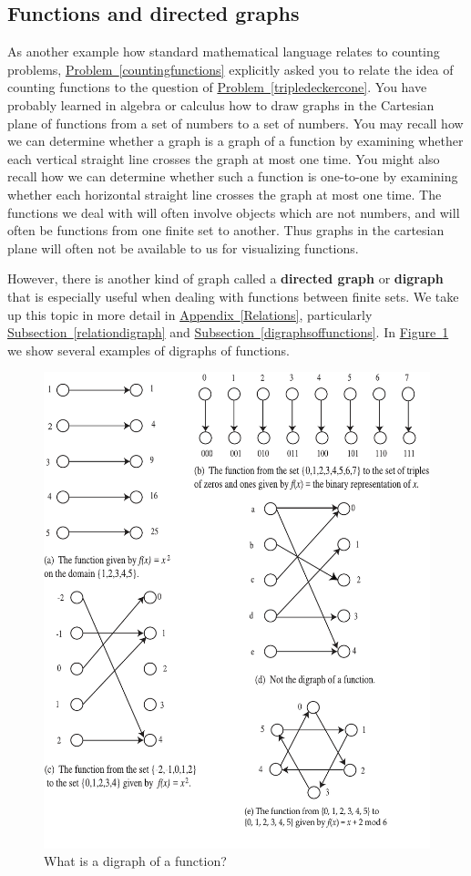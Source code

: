 \documentclass[10pt,]{book}
\newcommand{\terminology}[1]{\textbf{#1}}
\theoremstyle{plain}
\theoremstyle{definition}
\theoremstyle{definition}
\numberwithin{equation}{chapter}
\begin{document}
\subsection[{Functions and directed graphs}]{Functions and directed graphs}\label{subsection-2}
As another example how standard mathematical language relates to counting problems, \hyperref[countingfunctions]{Problem~\ref{countingfunctions}} explicitly asked you to relate the idea of counting functions to the question of \hyperref[tripledeckercone]{Problem~\ref{tripledeckercone}}. You have probably learned in algebra or calculus how to draw graphs in the Cartesian plane of functions from a set of numbers to a set of numbers. You may recall how we can determine whether a graph is a graph of a function by examining whether each vertical straight line crosses the graph at most one time. You might also recall how we can determine whether such a function is one-to-one by examining whether each horizontal straight line crosses the graph at most one time. The functions we deal with will often involve objects which are not numbers, and will often be functions from one finite set to another. Thus graphs in the cartesian plane will often not be available to us for visualizing functions.%
\par
However, there is another kind of graph called a \terminology{directed graph} or \terminology{digraph} that is especially useful when dealing with functions between finite sets. We take up this topic in more detail in \hyperref[Relations]{Appendix~\ref{Relations}}, particularly \hyperref[relationdigraph]{Subsection~\ref{relationdigraph}} and \hyperref[digraphsoffunctions]{Subsection~\ref{digraphsoffunctions}}. In \hyperref[functiondigraphs]{Figure~\ref{functiondigraphs}} we show several examples of digraphs of functions.%
\begin{figure}
\centering
\includegraphics[width=0.73\linewidth]{images/functiondigraph}
\caption{What is a digraph of a function?\label{functiondigraphs}}
\end{figure}
\end{document}
